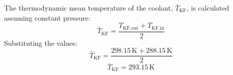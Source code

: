 The thermodynamic mean temperature of the coolant, \( \bar{T}_{\text{KF}} \), is calculated assuming constant pressure:  
\[
\bar{T}_{\text{KF}} = \frac{T_{\text{KF,out}} + T_{\text{KF,in}}}{2}
\]  
Substituting the values:  
\[
\bar{T}_{\text{KF}} = \frac{298.15 \, \text{K} + 288.15 \, \text{K}}{2}
\]  
\[
\bar{T}_{\text{KF}} = 293.15 \, \text{K}
\]